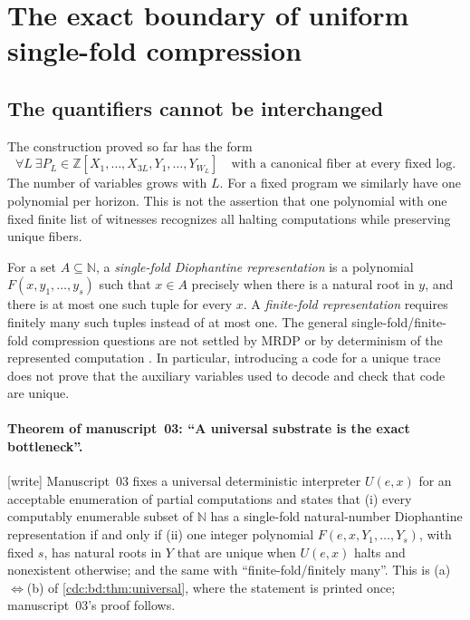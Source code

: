 \documentclass[11pt,a4paper]{article}
\theoremstyle{definition}
\theoremstyle{remark}
\newcommand{\N}{\mathbb N}
\newcommand{\Z}{\mathbb Z}
\newcommand{\wtag}{\textup{[write]}}%
\newcommand{\srctag}[1]{\texorpdfstring{\hspace{0.5em}{\normalfont\small\color{accent}[#1]}}{ [#1]}}
\begin{document}
\section{The exact boundary of uniform single-fold compression\srctag{03}}
\label{cdc:mem:sec:boundary}
\subsection{The quantifiers cannot be interchanged}
The construction proved so far has the form
\begin{equation}\label{cdc:mem:eq:family-order}
 \forall L\ \exists P_L\in\Z[X_1,\ldots,X_{3L},Y_1,\ldots,Y_{W_L}]
 \quad\text{with a canonical fiber at every fixed log.}
\end{equation}
The number of variables grows with $L$. For a fixed program we similarly have
one polynomial per horizon. This is not the assertion that one polynomial with
one fixed finite list of witnesses recognizes all halting computations while
preserving unique fibers.

For a set $A\subseteq\N$, a \emph{single-fold Diophantine representation} is a
polynomial $F(x,y_1,\ldots,y_s)$ such that $x\in A$ precisely when there is a
natural root in $y$, and there is at most one such tuple for every $x$. A
\emph{finite-fold representation} requires finitely many such tuples instead
of at most one. The general single-fold/finite-fold compression questions are
not settled by MRDP or by determinism of the represented computation
\cite{mat2010}. In particular, introducing a code for a unique trace does
not prove that the auxiliary variables used to decode and check that code are
unique.


\paragraph{Theorem of manuscript~03: ``A universal substrate is the exact bottleneck''.} \wtag{} Manuscript~03 fixes a universal deterministic interpreter $U(e,x)$ for an acceptable enumeration of partial computations and states that (i) every computably enumerable subset of $\N$ has a single-fold natural-number Diophantine representation if and only if (ii) one integer polynomial $F(e,x,Y_1,\ldots,Y_s)$, with fixed $s$, has natural roots in $Y$ that are unique when $U(e,x)$ halts and nonexistent otherwise; and the same with ``finite-fold/finitely many''. This is (a)$\Leftrightarrow$(b) of \cref{cdc:bd:thm:universal}, where the statement is printed once; manuscript~03's proof follows.
\end{document}
